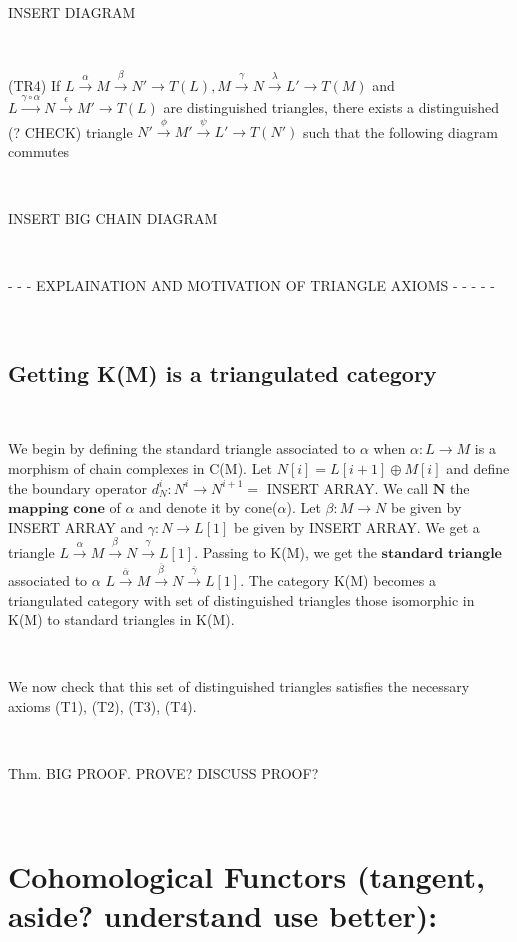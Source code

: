 \documentclass[12pt]{amsart}    %
\theoremstyle{definition}
\begin{document}
\

INSERT DIAGRAM

\

(TR4) If $L \xrightarrow{\alpha} M \xrightarrow{\beta} N' \rightarrow T(L), M \xrightarrow{\gamma} N \xrightarrow{\lambda} L' \rightarrow T(M)$ and $L \xrightarrow{\gamma \circ \alpha} N \xrightarrow{\epsilon} M' \rightarrow T(L)$ are distinguished triangles, there exists a distinguished (? CHECK) triangle $N' \xrightarrow{\phi} M' \xrightarrow{\psi} L' \rightarrow T(N')$ such that the following diagram commutes

\

INSERT BIG CHAIN DIAGRAM

\

- - - EXPLAINATION AND MOTIVATION OF TRIANGLE AXIOMS - - - - -

\

\subsection{Getting K(M) is a triangulated category}

\

We begin by defining the standard triangle associated to $\alpha$ when $\alpha: L \rightarrow M$ is a morphism of chain complexes in C(M).  Let $N[i] = L[i+1]\oplus M[i]$ and define the boundary operator $d_N^i: N^i \rightarrow N^{i+1} = $ INSERT ARRAY.  We call $\textbf{N}$ the $\textbf{mapping cone}$ of $\alpha$ and denote it by cone($\alpha$).  Let $\beta: M \rightarrow N$ be given by INSERT ARRAY and $\gamma: N \rightarrow L[1]$ be given by INSERT ARRAY.  We get a triangle $L \xrightarrow{\alpha} M \xrightarrow{\beta} N \xrightarrow{\gamma} L[1]$. Passing to K(M), we get the $\textbf{standard triangle}$ associated to $\alpha$ $L \xrightarrow{\overline{\alpha}} M \xrightarrow{\overline{\beta}} N \xrightarrow{\overline{\gamma}} L[1]$.  The category K(M) becomes a triangulated category with set of distinguished triangles those isomorphic in K(M) to standard triangles in K(M).  

\

We now check that this set of distinguished triangles satisfies the necessary axioms (T1), (T2), (T3), (T4).

\

Thm.  BIG PROOF. PROVE? DISCUSS PROOF? 

\

\section{Cohomological Functors (tangent, aside? understand use better):}
\end{document}
